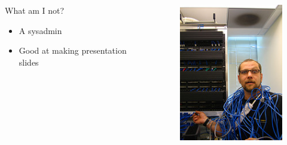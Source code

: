 \documentclass{beamer}
\begin{document}
\begin{frame}
    \begin{columns}
        \begin{column}{0.5\textwidth}
            What am I not? 
            \begin{itemize}
                \item A sysadmin
                \item Good at making presentation slides
            \end{itemize}
        \end{column}
        \begin{column}{0.5\textwidth}
            \begin{figure}
                \centering
                \includegraphics[width=1\textwidth,keepaspectratio]{../resources/sysadmin.jpg}
            \end{figure}
        \end{column}
    \end{columns}
\end{frame}
\end{document}
